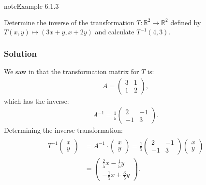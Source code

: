 \documentclass[letterpaper,10pt,english]{jupyterBook}
\begin{document}
\begin{sphinxadmonition}{note}{Example 6.1.3}



\sphinxAtStartPar
Determine the inverse of the transformation \(T: \mathbb{R}^2 \to \mathbb{R}^2\) defined by \(T(x, y) \mapsto (3 x + y, x + 2 y)\) and calculate \(T^{-1}(4,3)\).
\subsubsection*{Solution}

\sphinxAtStartPar
We saw in {\hyperref[\detokenize{_pages/6.1_Transformation_matrices:transformation-matrix-example}]{}} that the transformation matrix for \(T\) is:
\begin{equation*}
\begin{split} A = \begin{pmatrix} 3 & 1 \\ 1 & 2 \end{pmatrix}, \end{split}
\end{equation*}
\sphinxAtStartPar
which has the inverse:
\begin{equation*}
\begin{split} A^{-1} = \frac{1}{5} \begin{pmatrix} 2 & -1 \\ -1 & 3 \end{pmatrix}. \end{split}
\end{equation*}
\sphinxAtStartPar
Determining the inverse transformation:
\begin{equation*}
\begin{split} \begin{align*}
    T^{-1}\begin{pmatrix} x \\ y \end{pmatrix} &= A^{-1} \cdot \begin{pmatrix} x \\ y \end{pmatrix} =
    \frac{1}{5} \begin{pmatrix} 2 & -1 \\ -1 & 3 \end{pmatrix}
    \begin{pmatrix} x \\ y \end{pmatrix} \\
    &= \begin{pmatrix} \frac{2}{5}x - \frac{1}{5}y \\ -\frac{1}{5}x + \frac{3}{5}y \end{pmatrix}.

\end{align*}
\end{split}
\end{equation*}
\end{sphinxadmonition}
\end{document}
